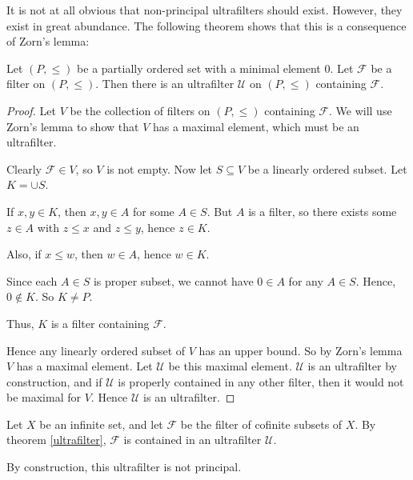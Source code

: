\documentclass{owmaths}
\begin{document}
It is not at all obvious that non-principal ultrafilters should exist. However,
they exist in great abundance. The following theorem
shows that this is a consequence of Zorn's lemma:
\begin{theorem}
\label{ultrafilter}
    Let $(P,\leq)$ be a partially ordered set with a minimal element $0$. Let
    $\mathcal{F}$ be a filter on $(P,\leq)$. Then there is an ultrafilter 
    $\mathcal{U}$ on $(P,\leq)$ containing $\mathcal{F}$.
\end{theorem}
\begin{proof}
    Let $V$ be the collection of filters on $(P,\leq)$ containing $\mathcal{F}$.
    We will use Zorn's lemma to show that $V$ has a maximal element, which must
    be an ultrafilter.
    
    Clearly $\mathcal{F} \in V$, so $V$ is not empty. Now let $S \subseteq V$
    be a linearly ordered subset. Let $K = \cup S$. 
    
    If $x,y \in K$, then $x,y \in A$ for some $A \in S$. But
    $A$ is a filter, so there exists some $z \in A$ with $z \leq x$ and $z \leq y$,
    hence $z \in K$.
    
    Also, if $x \leq w$, then $w \in A$, hence $w \in K$.
    
    Since each $A \in S$ is proper subset, we cannot have $0 \in A$ for any $A \in S$.
    Hence, $0 \notin K$. So $K \neq P$.
    
    Thus, $K$ is a filter containing $\mathcal{F}$. 
    
    Hence any linearly ordered subset of $V$ has an upper bound. So by Zorn's lemma
    $V$ has a maximal element. Let $\mathcal{U}$
    be this maximal element. $\mathcal{U}$ is an ultrafilter by construction,
    and if $\mathcal{U}$ is properly contained in any other filter, then it would not
    be maximal for $V$. Hence $\mathcal{U}$ is an ultrafilter.
\end{proof}
\begin{example}
    Let $X$ be an infinite set, and let $\mathcal{F}$ be the filter
    of cofinite subsets of $X$. By theorem \ref{ultrafilter},
    $\mathcal{F}$ is contained in an ultrafilter $\mathcal{U}$.
    
    By construction, this ultrafilter is not principal.
\end{example}
\end{document}
